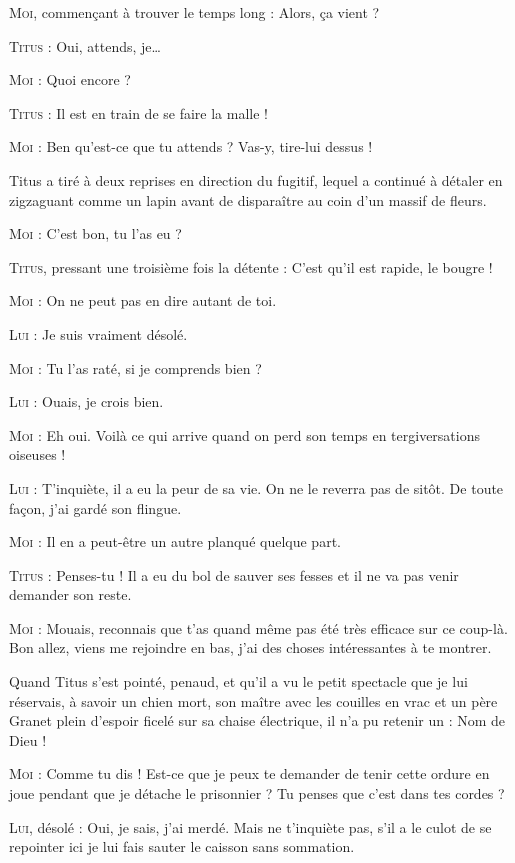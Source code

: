 \textsc{Moi}, commençant à trouver le temps long : Alors, ça vient ?

\textsc{Titus} : Oui, attends, je…

\textsc{Moi} : Quoi encore ?

\textsc{Titus} : Il est en train de se faire la malle !

\textsc{Moi} : Ben qu’est-ce que tu attends ? Vas-y, tire-lui dessus !

Titus a tiré à deux reprises en direction du fugitif, lequel a continué à détaler en zigzaguant comme un lapin avant de disparaître au coin d’un massif de fleurs.

\textsc{Moi} : C’est bon, tu l’as eu ?

\textsc{Titus}, pressant une troisième fois la détente : C’est qu’il est rapide, le bougre !

\textsc{Moi} : On ne peut pas en dire autant de toi.

\textsc{Lui} : Je suis vraiment désolé.

\textsc{Moi} : Tu l’as raté, si je comprends bien ?

\textsc{Lui} : Ouais, je crois bien.

\textsc{Moi} : Eh oui. Voilà ce qui arrive quand on perd son temps en tergiversations oiseuses !

\textsc{Lui} : T’inquiète, il a eu la peur de sa vie. On ne le reverra pas de sitôt. De toute façon, j’ai gardé son flingue.

\textsc{Moi} : Il en a peut-être un autre planqué quelque part.

\textsc{Titus} : Penses-tu ! Il a eu du bol de sauver ses fesses et il ne va pas venir demander son reste.

\textsc{Moi} : Mouais, reconnais que t’as quand même pas été très efficace sur ce coup-là. Bon allez, viens me rejoindre en bas, j’ai des choses intéressantes à te montrer.

Quand Titus s’est pointé, penaud, et qu’il a vu le petit spectacle que je lui réservais, à savoir un chien mort, son maître avec les couilles en vrac et un père Granet plein d’espoir ficelé sur sa chaise électrique, il n’a pu retenir un : Nom de Dieu !

\textsc{Moi} : Comme tu dis ! Est-ce que je peux te demander de tenir cette ordure en joue pendant que je détache le prisonnier ? Tu penses que c’est dans tes cordes ?

\textsc{Lui}, désolé : Oui, je sais, j’ai merdé. Mais ne t’inquiète pas, s’il a le culot de se repointer ici je lui fais sauter le caisson sans sommation.

